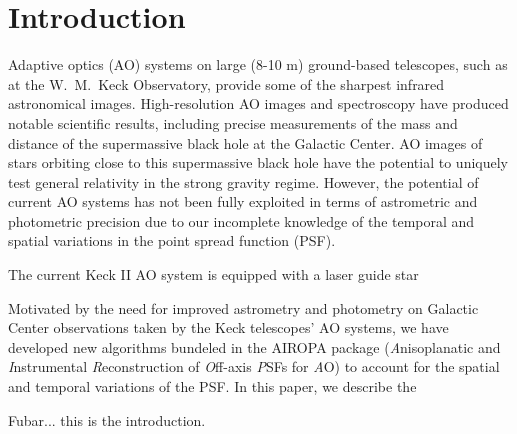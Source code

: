 \maketitle
\section{Introduction}

Adaptive optics (AO) systems on large (8-10 m)
ground-based telescopes, such as at the W.~M.~Keck Observatory,
provide some of the sharpest infrared astronomical images. 
High-resolution AO images and spectroscopy have produced 
notable scientific results, including precise measurements of the mass
and distance of the supermassive black hole at the Galactic Center. 
AO images of stars orbiting close to this supermassive black
hole have the potential to uniquely test general relativity in the strong
gravity regime. However, the potential of current AO systems has not been
fully exploited in terms of astrometric and photometric precision due
to our incomplete knowledge of the temporal and spatial variations in
the point spread function (PSF). 

The current Keck II AO system is equipped with a laser guide star 


Motivated by the need for improved
astrometry and photometry on Galactic Center observations taken by the
Keck telescopes' AO systems, we have developed new algorithms bundeled
in the AIROPA package ({\it A}nisoplanatic and {\it I}nstrumental {\it
  R}econstruction of {\it O}ff-axis {\it P}SFs for {\it A}O) to
account for the spatial and temporal variations of the PSF. 
In this paper, we describe the 


Fubar... this is the introduction. \cite{Britton:2006}


